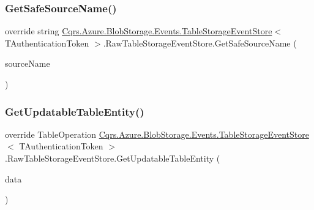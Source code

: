 \subsubsection{\texorpdfstring{Get\+Safe\+Source\+Name()}{GetSafeSourceName()}}
{\footnotesize\ttfamily override string \hyperlink{classCqrs_1_1Azure_1_1BlobStorage_1_1Events_1_1TableStorageEventStore}{Cqrs.\+Azure.\+Blob\+Storage.\+Events.\+Table\+Storage\+Event\+Store}$<$ T\+Authentication\+Token $>$.Raw\+Table\+Storage\+Event\+Store.\+Get\+Safe\+Source\+Name (\begin{DoxyParamCaption}\item[{string}]{source\+Name }\end{DoxyParamCaption})\hspace{0.3cm}{\ttfamily [protected]}}

\mbox{\label{classCqrs_1_1Azure_1_1BlobStorage_1_1Events_1_1TableStorageEventStore_1_1RawTableStorageEventStore_afa1fdd2a115ebf6e12411f8a9e7029a9_afa1fdd2a115ebf6e12411f8a9e7029a9}} 
\subsubsection{\texorpdfstring{Get\+Updatable\+Table\+Entity()}{GetUpdatableTableEntity()}\hspace{0.1cm}{\footnotesize\ttfamily [1/2]}}
{\footnotesize\ttfamily override Table\+Operation \hyperlink{classCqrs_1_1Azure_1_1BlobStorage_1_1Events_1_1TableStorageEventStore}{Cqrs.\+Azure.\+Blob\+Storage.\+Events.\+Table\+Storage\+Event\+Store}$<$ T\+Authentication\+Token $>$.Raw\+Table\+Storage\+Event\+Store.\+Get\+Updatable\+Table\+Entity (\begin{DoxyParamCaption}\item[{\hyperlink{classCqrs_1_1Events_1_1EventData}{Event\+Data}}]{data }\end{DoxyParamCaption})\hspace{0.3cm}{\ttfamily [protected]}}

